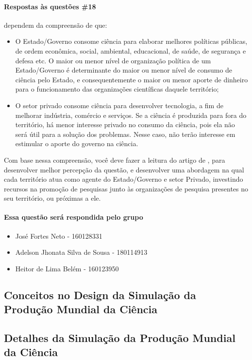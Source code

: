 \paragraph{Respostas às questões \#18} dependem da compreensão de que:
\begin{itemize}
    \item O Estado/Governo consome ciência para elaborar melhores políticas públicas, de ordem econômica, social, ambiental, educacional, de saúde, de segurança e defesa etc. O maior ou menor nível de organização política de um Estado/Governo é determinante do maior ou menor nível de consumo de ciência pelo Estado, e consequentemente o maior ou menor aporte de dinheiro para o funcionamento das organizações científicas daquele território;
    \item O setor privado consome ciência para desenvolver tecnologia, a fim de melhorar indústria, comércio e serviços. Se a ciência é produzida para fora do território, há menor interesse privado no consumo da ciência, pois ela não será útil para a solução dos problemas. Nesse caso, não terão interesse em estimular o aporte do governo na ciência.
\end{itemize}
Com base nessa compreensão, você deve fazer a leitura do artigo de \cite{schepelmann_evidence-based_2021}, para desenvolver melhor percepção da questão, e desenvolver uma abordagem na qual cada território atua como agente do Estado/Governo e setor Privado, investindo recursos na promoção de pesquisas junto às organizações de pesquisa presentes no seu território, ou próximas a ele.  

\paragraph{Essa questão será respondida pelo grupo}
\begin{itemize}
    \item José Fortes Neto - 160128331
    \item Adelson Jhonata Silva de Sousa - 180114913
    \item Heitor de Lima Belém - 160123950
\end{itemize}

\subsection{Conceitos no Design da Simulação da Produção Mundial da Ciência}


\subsection{Detalhes da Simulação da Produção Mundial da Ciência}

